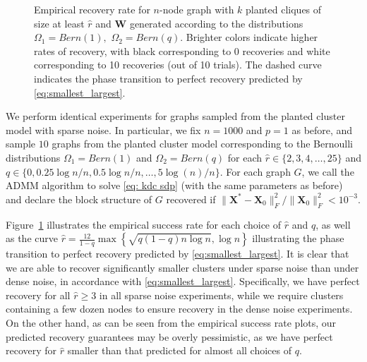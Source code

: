 \documentclass[twoside,11pt]{article}
\newcommand{\bs}{\boldsymbol}
\newcommand{\X}{\bs {X}}
\newcommand{\W}{\bs {W}}
\newcommand{\0}{\bs{0}}
\newcommand{\bra}[1]{\ensuremath{\left\{ #1 \right\}}} %
\begin{document}
{\begin{figure}[t]
	\centering
		\caption{Empirical recovery rate for $n$-node graph with $k$ planted cliques of size at least $\hat r$ and \(\W\) generated
		according to the distributions $\Omega_1 = Bern(1),$ $\Omega_2 = Bern(q)$. Brighter colors indicate higher
		rates of recovery, with black corresponding to 0 recoveries and white corresponding to 10 recoveries (out of 10 trials).
		The dashed curve indicates the phase transition to perfect recovery predicted by \eqref{eq:smallest_largest}.}
	\label{fig: rec}
\end{figure}

We perform identical experiments for graphs sampled from the planted cluster model with sparse noise.
In particular, we fix \( n =1000\) and \(p=1\) as before, and sample \(10\) graphs 
from the planted cluster model corresponding to the Bernoulli
distributions \(\Omega_1 = Bern(1)\) and \(\Omega_2 = Bern(q)\) for each 
\( \hat r \in \{2,3,4,\dots, 25\}\) and \(q \in \{0, 0.25 \log n/n, 0.5 \log n/n, \dots, 5 \log (n) / n\}\).
For each graph \(G\), we call the ADMM algorithm to solve \eqref{eq: kdc sdp} (with the same parameters as before)
and declare the block structure of \(G\) recovered if \(\|\X^* - \X_0\|^2_F / \|\X_0\|^2_F < 10^{-3} \). 

Figure~\ref{fig: rec} illustrates the empirical success rate for each choice of \(\hat r\) and \(q\), as well as the curve \( \hat r = \frac{12}{1-q} \max \bra{ \sqrt{q(1-q) n \log n}, \log n} \)
illustrating the phase transition to perfect recovery predicted by \eqref{eq:smallest_largest}.
It is clear that we are able to recover significantly smaller clusters under sparse noise than under dense noise, in accordance with \eqref{eq:smallest_largest}. 
Specifically, we have perfect recovery for all \(\hat r \ge 3\) in all sparse noise experiments,
while we require clusters containing a few dozen nodes to ensure recovery in the dense noise experiments.
On the other hand, as can be seen from the empirical success rate plots, our predicted recovery guarantees may be overly pessimistic, as
we have perfect recovery for \(\hat r\) smaller than that predicted for almost all choices of \(q\).

}
\end{document}
